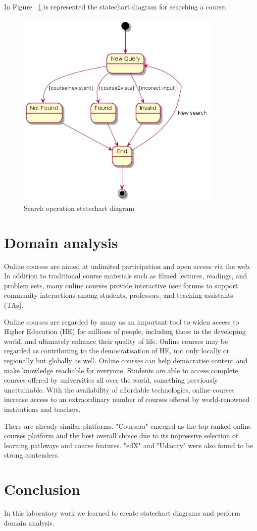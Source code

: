 \documentclass[12pt,a4paper,titlepage]{article}
\begin{document}
In Figure ~\ref{fig:search} is represented the statechart diagram for searching a course.
\begin{figure}[H]
\centering
\includegraphics[width=10cm]{search}
\caption{Search operation statechart diagram}
\label{fig:search}
\end{figure}


\section{Domain analysis}
Online courses are aimed at unlimited participation and open access via the web. In addition to traditional course materials such as filmed lectures, readings, and problem sets, many online courses provide interactive user forums to support community interactions among students, professors, and teaching assistants (TAs).\par
Online courses are regarded by many as an important tool to widen access to Higher Education (HE) for millions of people, including those in the developing world, and ultimately enhance their quality of life. Online courses may be regarded as contributing to the democratisation of HE, not only locally or regionally but globally as well. Online courses can help democratise content and make knowledge reachable for everyone. Students are able to access complete courses offered by universities all over the world, something previously unattainable. With the availability of affordable technologies, online courses increase access to an extraordinary number of courses offered by world-renowned institutions and teachers.\par
There are already similar platforms. "Coursera" emerged as the top ranked online courses platform and the best overall choice due to its impressive selection of learning pathways and course features. "edX" and "Udacity" were also found to be strong contenders.
\section{Conclusion}
In this laboratory work we learned to create statechart diagrams and perform domain analysis.

\clearpage
\cleardoublepage
\end{document}
